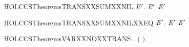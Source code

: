 \newcommand{\HOLCCSTheoremsTRANSXXSUMXXEQYY}{\UseVerbatim{HOLCCSTheoremsTRANSXXSUMXXEQYY}}
\begin{SaveVerbatim}{HOLCCSTheoremsTRANSXXSUMXXNIL}
\HOLTokenTurnstile{} \HOLSymConst{\HOLTokenForall{}}  \ensuremath{\HOLBoundVar{E}\sp{\prime}}.  \HOLSymConst{\ensuremath{+}}  \HOLTokenTransBegin{}\HOLTokenTransEnd \ensuremath{\HOLBoundVar{E}\sp{\prime}} \HOLSymConst{\HOLTokenImp{}}  \HOLTokenTransBegin{}\HOLTokenTransEnd \ensuremath{\HOLBoundVar{E}\sp{\prime}}
\end{SaveVerbatim}
\newcommand{\HOLCCSTheoremsTRANSXXSUMXXNIL}{\UseVerbatim{HOLCCSTheoremsTRANSXXSUMXXNIL}}
\begin{SaveVerbatim}{HOLCCSTheoremsTRANSXXSUMXXNILXXEQ}
\HOLTokenTurnstile{} \HOLSymConst{\HOLTokenForall{}}  \ensuremath{\HOLBoundVar{E}\sp{\prime}}.  \HOLSymConst{\ensuremath{+}}  \HOLTokenTransBegin{}\HOLTokenTransEnd \ensuremath{\HOLBoundVar{E}\sp{\prime}} \HOLSymConst{\HOLTokenEquiv{}}  \HOLTokenTransBegin{}\HOLTokenTransEnd \ensuremath{\HOLBoundVar{E}\sp{\prime}}
\end{SaveVerbatim}
\newcommand{\HOLCCSTheoremsTRANSXXSUMXXNILXXEQ}{\UseVerbatim{HOLCCSTheoremsTRANSXXSUMXXNILXXEQ}}
\begin{SaveVerbatim}{HOLCCSTheoremsVARXXNOXXTRANS}
\HOLTokenTurnstile{} \HOLSymConst{\HOLTokenForall{}}  . \HOLSymConst{\HOLTokenNeg{}}\ensuremath{(}  \HOLTokenTransBegin{}\HOLTokenTransEnd {}\ensuremath{)}
\end{SaveVerbatim}
\newcommand{\HOLCCSTheoremsVARXXNOXXTRANS}{\UseVerbatim{HOLCCSTheoremsVARXXNOXXTRANS}}
